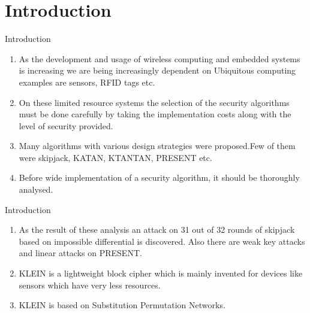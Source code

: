 \section{Introduction}

\begin{frame}{Introduction}
\begin{enumerate}
    \item As the development and usage of wireless computing and embedded systems is increasing we are being increasingly dependent on Ubiquitous computing examples are sensors, RFID tags etc.
    \item On these limited resource systems the selection of the security algorithms must be done carefully by taking the implementation costs along with the level of security provided.
    \item Many algorithms with various design strategies were proposed.Few of them were skipjack, KATAN, KTANTAN, PRESENT etc.
    \item Before wide implementation of a security algorithm, it should be thoroughly analysed.
    \seti
\end{enumerate}
\end{frame}

\begin{frame}{Introduction}
\begin{enumerate}
    \conti
    \item As the result of these analysis an attack on 31 out of 32 rounds of skipjack based on impossible differential is discovered. Also there are weak key attacks and linear attacks on PRESENT.
    \item  KLEIN is a lightweight block cipher which is mainly invented for devices like sensors which have very less resources.
    \item KLEIN is based on Substitution Permutation Networks.
    \seti
\end{enumerate}
\end{frame}
